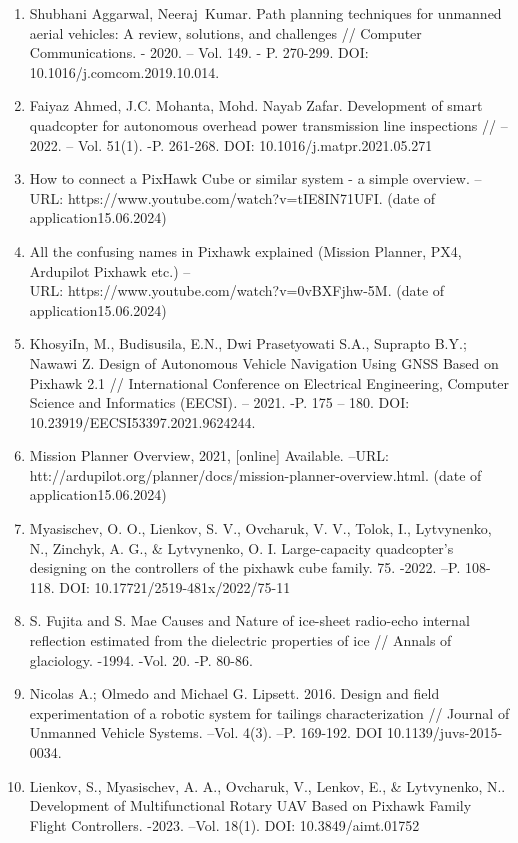 \begin{noparindent}

\begin{enumerate}
\def\labelenumi{\arabic{enumi}.}
\item
  Shubhani Aggarwal, Neeraj~Kumar. Path planning techniques for unmanned
  aerial vehicles: A review, solutions, and challenges // Computer
  Communications. - 2020. -- Vol. 149. - P. 270-299. DOI:
  10.1016/j.comcom.2019.10.014.
\item
  Faiyaz Ahmed, J.C. Mohanta, Mohd. Nayab Zafar. Development of smart
  quadcopter for autonomous overhead power transmission line inspections
  // -- 2022. -- Vol. 51(1). -P. 261-268. DOI:
  10.1016/j.matpr.2021.05.271
\item
  How to connect a PixHawk Cube or similar system - a simple overview.
  --URL: https://www.youtube.com/watch?v=tIE8IN71UFI. (date of
  application15.06.2024)
\item
  All the confusing names in \textquotesingle Pixhawk\textquotesingle{}
  explained (Mission Planner, PX4, Ardupilot Pixhawk etc.) --\\URL:
  https://www.youtube.com/watch?v=0vBXFjhw-5M. (date of
  application15.06.2024)
\item
  Khosyi\textquotesingle In, M., Budisusila, E.N., Dwi Prasetyowati
  S.A., Suprapto B.Y.; Nawawi Z. Design of Autonomous Vehicle Navigation
  Using GNSS Based on Pixhawk 2.1 // International Conference on
  Electrical Engineering, Computer Science and Informatics
  (EECSI)\emph{.} -- 2021. -P. 175 -- 180. DOI:
  10.23919/EECSI53397.2021.9624244.
\item
  Mission Planner Overview, 2021, {[}online{]} Available. --URL:
  htt://ardupilot.org/planner/docs/mission-planner-overview.html. (date
  of application15.06.2024)
\item
  Myasischev, O. O., Lienkov, S. V., Ovcharuk, V. V., Tolok, I.,
  Lytvynenko, N., Zinchyk, A. G., \& Lytvynenko, O. I. Large-capacity
  quadcopter's designing on the controllers of the pixhawk cube family.
  75. -2022. --P. 108-118. DOI: 10.17721/2519-481x/2022/75-11
\item
  S. Fujita and S. Mae Causes and Nature of ice-sheet radio-echo
  internal reflection estimated from the dielectric properties of ice //
  Annals of glaciology. -1994. -Vol. 20. -P. 80-86.
\item
  Nicolas A.; Olmedo and Michael G. Lipsett. 2016. Design and field
  experimentation of a robotic system for tailings characterization //
  Journal of Unmanned Vehicle Systems. --Vol. 4(3). --P. 169-192. DOI
  10.1139/juvs-2015-0034.
\item
  Lienkov, S., Myasischev, A. A., Ovcharuk, V., Lenkov, E., \&
  Lytvynenko, N.. Development of Multifunctional Rotary UAV Based on
  Pixhawk Family Flight Controllers. -2023. --Vol. 18(1). DOI:
  10.3849/aimt.01752
\end{enumerate}
\end{noparindent}

